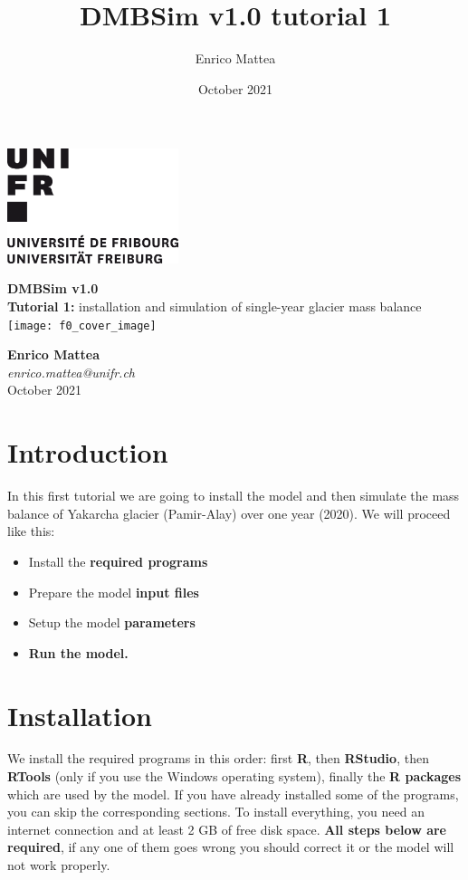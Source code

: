 \documentclass[15pt]{extarticle}
\title{DMBSim v1.0 tutorial 1}
\author{Enrico Mattea}
\date{October 2021}
\begin{document}

\begin{titlepage}
    \includegraphics[width=5cm]{unifr_logo}
    \par
    \vspace{2.0cm}
	\centering
	{\huge\textbf{DMBSim v1.0\\}}
	\vspace{0.3 cm}
	{\large \textbf{Tutorial 1:} installation and simulation of single-year glacier mass balance\\}
	\vspace{2.4 cm}
	\texttt{[image: f0\_cover\_image]}\par
	\vspace{2.1 cm}
	{\normalsize \textbf{Enrico Mattea}\\}
	{\normalsize \textit{enrico.mattea@unifr.ch\\}}
	\vspace{0.6 cm}
	{\normalsize October 2021}


	\vfill

\end{titlepage}


\section{Introduction}
In this first tutorial we are going to install the model and then simulate the mass balance of Yakarcha glacier (Pamir-Alay) over one year (2020).
We will proceed like this:
\begin{itemize}
    \item Install the \textbf{required programs}
    \item Prepare the model \textbf{input files}
    \item Setup the model \textbf{parameters}
    \item \textbf{Run the model.}
\end{itemize}

\clearpage
\section{Installation}
We install the required programs in this order: first \textbf{R}, then \textbf{RStudio}, then \textbf{RTools} (only if you use the Windows operating system), finally the \textbf{R packages} which are used by the model. If you have already installed some of the programs, you can skip the corresponding sections.
To install everything, you need an internet connection and at least 2 GB of free disk space. \textbf{All steps below are required}, if any one of them goes wrong you should correct it or the model will not work properly.
\end{document}
